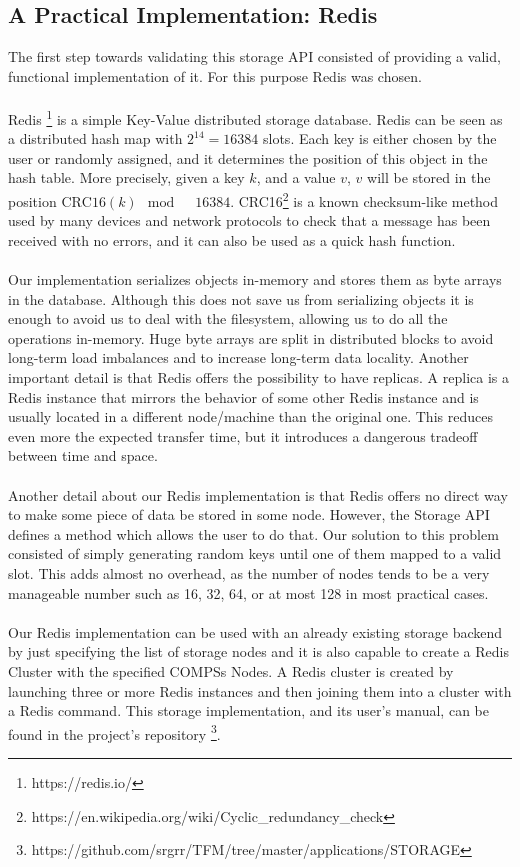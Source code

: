 \subsection{A Practical Implementation: Redis}
\label{subsec:storage_redis}
The first step towards validating this storage API consisted of providing a valid, functional implementation of it. For this purpose Redis was chosen.\\
\\
Redis \footnote{https://redis.io/} is a simple Key-Value distributed storage database. Redis can be seen as a distributed hash map with $2^{14} = 16384$ slots. Each key is either chosen by the user or randomly assigned, and it determines the position of this object in the hash table. More precisely, given a key $k$, and a value $v$, $v$ will be stored in the position $\textrm{CRC16}(k) \mod \quad 16384$. CRC16\footnote{https://en.wikipedia.org/wiki/Cyclic\_redundancy\_check} is a known checksum-like method used by many devices and network protocols to check that a message has been received with no errors, and it can also be used as a quick hash function.\\
\\
Our implementation serializes objects in-memory and stores them as byte arrays in the database. Although this does not save us from serializing objects it is enough to avoid us to deal with the filesystem, allowing us to do all the operations in-memory. Huge byte arrays are split in distributed blocks to avoid long-term load imbalances and to increase long-term data locality. Another important detail is that Redis offers the possibility to have replicas. A replica is a Redis instance that mirrors the behavior of some other Redis instance and is usually located in a different node/machine than the original one. This reduces even more the expected transfer time, but it introduces a dangerous tradeoff between time and space.\\
\\
Another detail about our Redis implementation is that Redis offers no direct way to make some piece of data be stored in some node. However, the Storage API defines a method which allows the user to do that. Our solution to this problem consisted of simply generating random keys until one of them mapped to a valid slot. This adds almost no overhead, as the number of nodes tends to be a very manageable number such as 16, 32, 64, or at most 128 in most practical cases.\\
\\
Our Redis implementation can be used with an already existing storage backend by just specifying the list of storage nodes and it is also capable to create a Redis Cluster with the specified COMPSs Nodes. A Redis cluster is created by launching three or more Redis instances and then joining them into a cluster with a Redis command. This storage implementation, and its user's manual, can be found in the project's repository \footnote{https://github.com/srgrr/TFM/tree/master/applications/STORAGE}.

